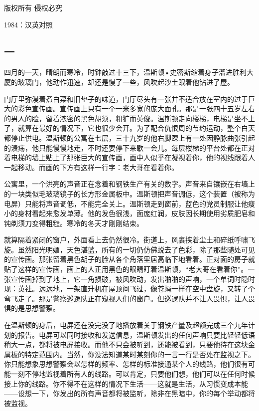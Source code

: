 版权所有 侵权必究

1984：汉英对照

\subsection{一}\label{ux4e00}

四月的一天，晴朗而寒冷，时钟敲过十三下，温斯顿•史密斯缩着身子溜进胜利大厦的玻璃门，他动作迅速，却还是慢了一些，风吹起沙土跟着他钻进了屋。

门厅里弥漫着煮白菜和旧垫子的味道，门厅尽头有一张并不适合放在室内的过于巨大的彩色宣传画。宣传画上只有一个一米多宽的庞大面孔。那是一张四十五岁左右的男人的脸，留着浓密的黑色胡须，粗犷而英俊。温斯顿走向楼梯，电梯是坐不上了，就算在最好的情况下，它也很少会开。为了配合仇恨周的节约运动，整个白天都停止供电。温斯顿的公寓在七层，三十九岁的他右脚踝上有一处因静脉曲张引起的溃疡，他只能慢慢地走，不时还要停下来歇一会儿。每层楼梯的平台处都在正对着电梯的墙上贴上了那张巨大的宣传画，画中人似乎在凝视着你，他的视线跟着人一起移动。而画的下方有这样一行字：老大哥在看着你。

公寓里，一个洪亮的声音正在念着和钢铁生产有关的数字。声音来自镶嵌在右墙上的一块类似毛玻璃镜子的长方形金属板中。温斯顿把声音调低，这个装置（被称为电屏）只能将声音调低，不能完全关上。温斯顿走到窗前，蓝色的党员制服让他瘦小的身材看起来愈发单薄。他的发色很浅，面庞红润，皮肤因长期使用劣质肥皂和钝剃须刀变得粗糙。寒冷的冬天才刚刚结束。

就算隔着紧闭的窗户，外面看上去仍然很冷。街道上，风裹挟着尘土和碎纸呼啸飞旋。虽然阳光明媚，天色湛蓝，所有的一切仍仿佛蜕去了色彩，除了那些随处可见的宣传画。那张留着黑色胡子的脸从各个角落里居高临下地看着。正对面的房子就贴了这样的宣传画，画上的人正用黑色的眼睛盯着温斯顿，``老大哥在看着你''。一张宣传画掉到了地上，它一角损破，被风吹动，发出啪啪的声响，一个单词时隐时现：英社。远远地，一架直升机在屋顶间飞过，像苍蝇一样在空中盘旋，又转了个弯飞走了。那是警察巡逻队正在窥视人们的窗户。但巡逻队并不让人畏惧，让人畏惧的是思想警察。

在温斯顿的身后，电屏还在没完没了地播放着关于钢铁产量及超额完成三个九年计划的报告。电屏可以同时接收和发送信息，温斯顿发出的任何声响只要比轻轻低语稍大一点，都将被电屏接收。而他不只会被听到，还能被看到，只要他待在这块金属板的特定范围内。当然，你没法知道某时某刻你的一言一行是否处在监视之下。你只能想象思想警察会以怎样的频率、怎样的标准接通某个人的线路，他们很有可能一刻不停地监视着所有人的线路。可以肯定，只要他们想，他们可以在任何时候接上你的线路。你不得不在这样的情况下生活------这就是生活，从习惯变成本能------设想一下，你发出的所有声音都将被监听，除非在黑暗中，你的每个举动都将被监视。

